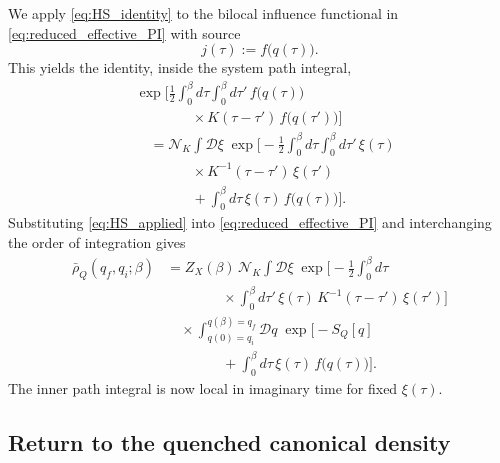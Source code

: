 We apply \eqref{eq:HS_identity} to the bilocal influence functional in
\eqref{eq:reduced_effective_PI} with source
\begin{equation}
    j(\tau) := f\!\big(q(\tau)\big).
\end{equation}
This yields the identity, inside the system path integral,
\begin{align}
    &\exp\!\bigg[
        \frac{1}{2}\int_0^\beta d\tau\int_0^\beta d\tau'\,
        f\!\big(q(\tau)\big)
    \nonumber\\
    &\qquad\qquad\times
        K(\tau-\tau')\,f\!\big(q(\tau')\big)
    \bigg]
    \nonumber\\
    &\quad=
    \mathcal N_K
    \int \mathcal D\xi\;
    \exp\bigg[
        -\frac{1}{2}\int_0^\beta d\tau\int_0^\beta d\tau'\,
        \xi(\tau)
    \nonumber\\
    &\qquad\qquad\times
        K^{-1}(\tau-\tau')\,\xi(\tau')
    \nonumber\\
    &\qquad\qquad
        +\int_0^\beta d\tau\,\xi(\tau)\,f\!\big(q(\tau)\big)
    \bigg].
    \label{eq:HS_applied}
\end{align}
Substituting \eqref{eq:HS_applied} into \eqref{eq:reduced_effective_PI} and
interchanging the order of integration gives
\begin{align}
    \bar\rho_Q(q_f,q_i;\beta)
    &=
    Z_X(\beta)\,\mathcal N_K
    \int \mathcal D\xi\;
    \exp\bigg[
        -\frac{1}{2}\int_0^\beta d\tau
    \nonumber\\
    &\qquad\qquad\times
        \int_0^\beta d\tau'\,
        \xi(\tau)\,K^{-1}(\tau-\tau')\,\xi(\tau')
    \bigg]
    \nonumber\\
    &\quad\times
    \int_{q(0)=q_i}^{q(\beta)=q_f}\!\!\mathcal Dq\;
    \exp\bigg[
        -S_Q[q] 
    \nonumber\\
    &\qquad\qquad
        + \int_0^\beta d\tau\,\xi(\tau)\,f\!\big(q(\tau)\big)
    \bigg].
    \label{eq:reduced_kernel_after_HS}
\end{align}
The inner path integral is now local in imaginary time for fixed $\xi(\tau)$.

\subsection{Return to the quenched canonical density}

